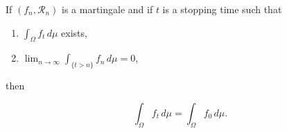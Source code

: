 If $(f_n, \mathcal{R}_n)$ is a martingale and if $t$ is a stopping time such that
\begin{enumerate}
  \item $\int_{\Omega} f_t \, d\mu$ exists,
  \item $\lim_{n \to \infty} \int_{\{t > n\}} f_n \, d\mu = 0$,
\end{enumerate}
then

$$\int_{\Omega} f_t \, d\mu = \int_{\Omega} f_0 \, d\mu.$$

